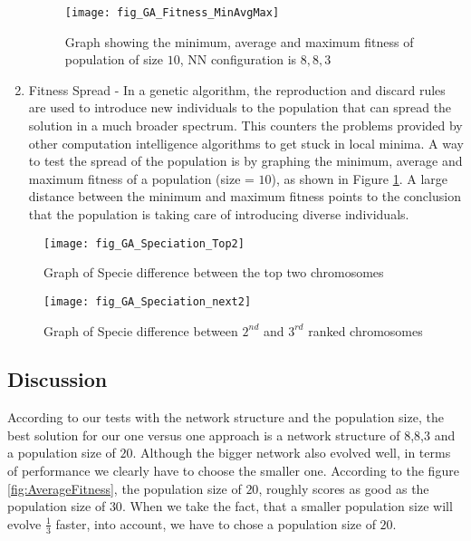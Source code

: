 \begin{enumerate}
\begin{figure}[htp]
\centerline{\texttt{[image: fig\_GA\_Fitness\_MinAvgMax]}}
\caption{Graph showing the minimum, average and maximum fitness of population of size $10$, NN configuration is $8,8,3$}
\label{fig:minAvgMaxFitness}
\end{figure}
\item Fitness Spread - In a genetic algorithm, the reproduction and discard rules are used to introduce new individuals to the population that can spread the solution in a much broader spectrum. This counters the problems provided by other computation intelligence algorithms to get stuck in local minima. A way to test the spread of the population is by graphing the minimum, average and maximum fitness of a population (size = $10$), as shown in Figure \ref{fig:minAvgMaxFitness}. A large distance between the minimum and maximum fitness points to the conclusion that the population is taking care of introducing diverse individuals.
\end{enumerate}

\begin{figure}[htp]
\centerline{\texttt{[image: fig\_GA\_Speciation\_Top2]}}
\caption{Graph of Specie difference between the top two chromosomes}
\label{fig:specieTop2}
\end{figure}
\begin{figure}[htp]
\centerline{\texttt{[image: fig\_GA\_Speciation\_next2]}}
\caption{Graph of Specie difference between $2^{nd}$ and $3^{rd}$ ranked chromosomes}
\label{fig:specieNext2}
\end{figure}

\subsection{Discussion}
According to our tests with the network structure and the population size, the best solution for our one versus one approach is a network structure of 8,8,3 and a population size of $20$. Although the bigger network also evolved well, in terms of performance we clearly have to choose the smaller one.
According to the figure \ref{fig:AverageFitness}, the population size of $20$, roughly scores as good as the population size of $30$. When we take the fact, that a smaller population size will evolve $\frac{1}{3}$ faster, into account, we have to chose a population size of $20$.

